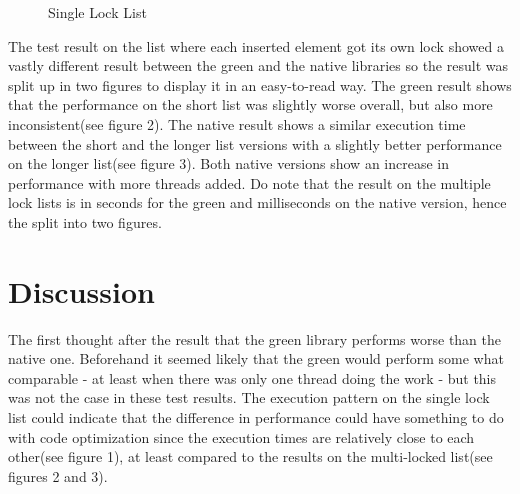 \documentclass{article}
\begin{document}
\begin{figure}
\hspace{4em}
\caption{Single Lock List}
\end{figure}

The test result on the list where each inserted element got its own lock showed a vastly different result between the green and the native libraries so the result was split up in two figures to display it in an easy-to-read way. The green result shows that the performance on the short list was slightly worse overall, but also more inconsistent(see figure 2). The native result shows a similar execution time between the short and the longer list versions with a slightly better performance on the longer list(see figure 3). Both native versions show an increase in performance with more threads added. Do note that the result on the multiple lock lists is in seconds for the green and milliseconds on the native version, hence the split into two figures.



\section{Discussion}\label{discussion}

The first thought after the result that the green library performs worse than the native one. Beforehand it seemed likely that the green would perform some what comparable - at least when there was only one thread doing the work - but this was not the case in these test results. The execution pattern on the single lock list could indicate that the difference in performance could have something to do with code optimization since the execution times are relatively close to each other(see figure 1), at least compared to the results on the multi-locked list(see figures 2 and 3). 
\end{document}
